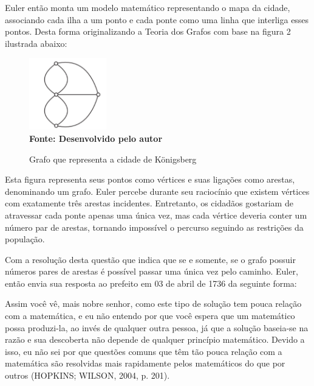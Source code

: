 Euler então monta um modelo matemático representando o mapa da cidade, associando cada ilha a um ponto e cada ponte como uma linha que interliga esses pontos.  Desta forma originalizando a Teoria dos Grafos com base na figura 2 ilustrada abaixo:

\begin{figure}[ht]
	\centering	
	\caption[\hspace{0.1cm}Grafo que representa a cidade de Königsberg.]{Grafo que representa a cidade de Königsberg}
	\vspace{-0.4cm}
	\includegraphics[width=0.3\textwidth]{figuras/grafo-cidade.png}
	 \vspace{-0.2cm}
	\\\textbf{\footnotesize Fonte: Desenvolvido pelo autor}
	\label{fig:figura1}
\end{figure}

Esta figura representa seus pontos como vértices e suas ligações como arestas, denominando um grafo. Euler percebe durante seu raciocínio que existem vértices com exatamente três arestas incidentes. Entretanto, os cidadãos gostariam de atravessar cada ponte apenas uma única vez, mas cada vértice deveria conter um número par de arestas, tornando impossível o percurso seguindo as restrições da população.

Com a resolução desta questão que indica que se e somente, se o grafo possuir números pares de arestas é possível passar uma única vez pelo caminho. Euler, então envia sua resposta ao prefeito em 03 de abril de 1736 da seguinte forma:

\begin{citacaodireta}
Assim você vê, mais nobre senhor, como este tipo de solução tem pouca relação com a matemática, e eu não entendo por que você espera que um matemático possa produzi-la, ao invés de qualquer outra pessoa, já que a solução baseia-se na razão e sua descoberta não depende de qualquer princípio matemático. Devido a isso, eu não sei por que questões comuns que têm tão pouca relação com a matemática são resolvidas mais rapidamente pelos matemáticos do que por outros (HOPKINS; WILSON, 2004, p. 201).
\end{citacaodireta}

